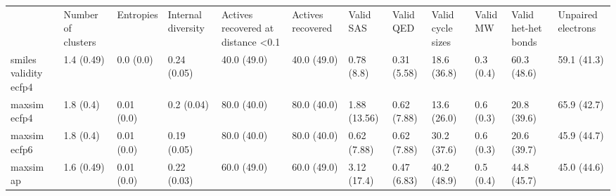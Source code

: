 \begin{tabular}{llllllllllll}
 & Number of clusters & Entropies & Internal diversity & Actives recovered at distance <0.1 & Actives recovered & Valid SAS & Valid QED & Valid cycle sizes & Valid MW & Valid het-het bonds & Unpaired electrons \\
smiles validity ecfp4 & {\cellcolor[HTML]{F5FBFC}} \color[HTML]{000000} 1.4 (0.49) & {\cellcolor[HTML]{F6FCFD}} \color[HTML]{000000} 0.0 (0.0) & {\cellcolor[HTML]{CDECE7}} \color[HTML]{000000} 0.24 (0.05) & {\cellcolor[HTML]{8FD4C2}} \color[HTML]{000000} 40.0 (49.0) & {\cellcolor[HTML]{8FD4C2}} \color[HTML]{000000} 40.0 (49.0) & {\cellcolor[HTML]{F6FCFD}} \color[HTML]{000000} 0.78 (8.8) & {\cellcolor[HTML]{F7FCFD}} \color[HTML]{000000} 0.31 (5.58) & {\cellcolor[HTML]{D9F1F0}} \color[HTML]{000000} 18.6 (36.8) & {\cellcolor[HTML]{F7FCFD}} \color[HTML]{000000} 0.3 (0.4) & {\cellcolor[HTML]{47B17E}} \color[HTML]{F1F1F1} 60.3 (48.6) & {\cellcolor[HTML]{4BB382}} \color[HTML]{F1F1F1} 59.1 (41.3) \\
maxsim ecfp4 & {\cellcolor[HTML]{F5FBFD}} \color[HTML]{000000} 1.8 (0.4) & {\cellcolor[HTML]{F6FCFD}} \color[HTML]{000000} 0.01 (0.0) & {\cellcolor[HTML]{D7F0EE}} \color[HTML]{000000} 0.2 (0.04) & {\cellcolor[HTML]{157F3B}} \color[HTML]{F1F1F1} 80.0 (40.0) & {\cellcolor[HTML]{157F3B}} \color[HTML]{F1F1F1} 80.0 (40.0) & {\cellcolor[HTML]{F5FBFC}} \color[HTML]{000000} 1.88 (13.56) & {\cellcolor[HTML]{F6FCFD}} \color[HTML]{000000} 0.62 (7.88) & {\cellcolor[HTML]{E3F4F8}} \color[HTML]{000000} 13.6 (26.0) & {\cellcolor[HTML]{F6FCFD}} \color[HTML]{000000} 0.6 (0.3) & {\cellcolor[HTML]{D4EFEC}} \color[HTML]{000000} 20.8 (39.6) & {\cellcolor[HTML]{39A569}} \color[HTML]{F1F1F1} 65.9 (42.7) \\
maxsim ecfp6 & {\cellcolor[HTML]{F5FBFC}} \color[HTML]{000000} 1.8 (0.4) & {\cellcolor[HTML]{F6FCFD}} \color[HTML]{000000} 0.01 (0.0) & {\cellcolor[HTML]{D8F0EF}} \color[HTML]{000000} 0.19 (0.05) & {\cellcolor[HTML]{157F3B}} \color[HTML]{F1F1F1} 80.0 (40.0) & {\cellcolor[HTML]{157F3B}} \color[HTML]{F1F1F1} 80.0 (40.0) & {\cellcolor[HTML]{F6FCFD}} \color[HTML]{000000} 0.62 (7.88) & {\cellcolor[HTML]{F6FCFD}} \color[HTML]{000000} 0.62 (7.88) & {\cellcolor[HTML]{B7E4DA}} \color[HTML]{000000} 30.2 (37.6) & {\cellcolor[HTML]{F6FCFD}} \color[HTML]{000000} 0.6 (0.3) & {\cellcolor[HTML]{D5EFED}} \color[HTML]{000000} 20.6 (39.7) & {\cellcolor[HTML]{77C9B0}} \color[HTML]{000000} 45.9 (44.7) \\
maxsim ap & {\cellcolor[HTML]{F4FBFC}} \color[HTML]{000000} 1.6 (0.49) & {\cellcolor[HTML]{F7FCFD}} \color[HTML]{000000} 0.01 (0.0) & {\cellcolor[HTML]{D3EEEB}} \color[HTML]{000000} 0.22 (0.03) & {\cellcolor[HTML]{48B27F}} \color[HTML]{F1F1F1} 60.0 (49.0) & {\cellcolor[HTML]{48B27F}} \color[HTML]{F1F1F1} 60.0 (49.0) & {\cellcolor[HTML]{F2FAFC}} \color[HTML]{000000} 3.12 (17.4) & {\cellcolor[HTML]{F6FCFD}} \color[HTML]{000000} 0.47 (6.83) & {\cellcolor[HTML]{8FD4C2}} \color[HTML]{000000} 40.2 (48.9) & {\cellcolor[HTML]{F6FCFD}} \color[HTML]{000000} 0.5 (0.4) & {\cellcolor[HTML]{7CCBB4}} \color[HTML]{000000} 44.8 (45.7) & {\cellcolor[HTML]{7ACBB3}} \color[HTML]{000000} 45.0 (44.6) \\

\end{tabular}
